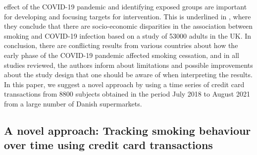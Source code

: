 \documentclass[
  11pt,
]{article}
\begin{document}
effect of the COVID-19 pandemic and identifying exposed groups are
important for developing and focusing targets for intervention. This is
underlined in \cite{UK_inequalities}, where they conclude that there are
socio-economic disparities in the association between smoking and
COVID-19 infection based on a study of 53000 adults in the UK. In
conclusion, there are conflicting results from various countries about
how the early phase of the COVID-19 pandemic affected smoking cessation,
and in all studies reviewed, the authors inform about limitations and
possible improvements about the study design that one should be aware of
when interpreting the results. In this paper, we suggest a novel
approach by using a time series of credit card transactions from 8800
subjects obtained in the period July 2018 to August 2021 from a large
number of Danish supermarkets.

\hypertarget{a-novel-approach-tracking-smoking-behaviour-over-time-using-credit-card-transactions}{%
\subsection{A novel approach: Tracking smoking behaviour over time using
credit card
transactions}\label{a-novel-approach-tracking-smoking-behaviour-over-time-using-credit-card-transactions}}
\end{document}
